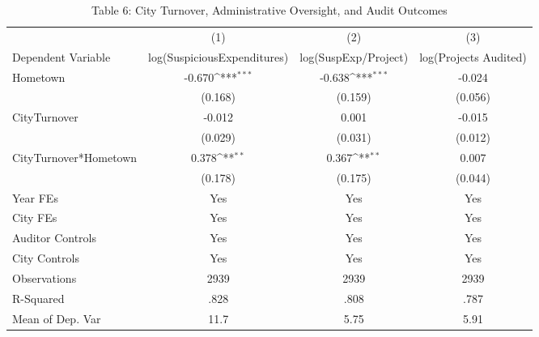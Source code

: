 \begin{table}[p]\centering\captionsetup{width=\textwidth,labelformat=empty}\begin{threeparttable}\footnotesize{
\def\sym#1{\ifmmode^{#1}\else\(^{#1}\)\fi}
\caption{Table 6: City Turnover, Administrative Oversight, and Audit Outcomes}
\begin{tabular}{l*{3}{c}}
\hline\hline
                    &\multicolumn{1}{c}{(1)}         &\multicolumn{1}{c}{(2)}         &\multicolumn{1}{c}{(3)}         \\
Dependent Variable & log(SuspiciousExpenditures) & log(SuspExp/Project) & log(Projects Audited) \\
\hline
Hometown            &      -0.670\sym{***}&      -0.638\sym{***}&      -0.024         \\
                    &     (0.168)         &     (0.159)         &     (0.056)         \\
CityTurnover        &      -0.012         &       0.001         &      -0.015         \\
                    &     (0.029)         &     (0.031)         &     (0.012)         \\
CityTurnover*Hometown&       0.378\sym{**} &       0.367\sym{**} &       0.007         \\
                    &     (0.178)         &     (0.175)         &     (0.044)         \\
\hline
Year FEs         & Yes & Yes & Yes \\
City FEs         & Yes & Yes & Yes \\
Auditor Controls & Yes & Yes & Yes \\
City Controls    & Yes & Yes & Yes \\
\hline
Observations        &        2939         &        2939         &        2939         \\
R-Squared           &        .828         &        .808         &        .787         \\
Mean of Dep. Var    &        11.7         &        5.75         &        5.91         \\
\hline\hline
\end{tabular}}
\captionsetup{justification=justified,labelformat=empty}
\begin{tablenotes}

\end{tablenotes}
\end{threeparttable}
\end{table}
